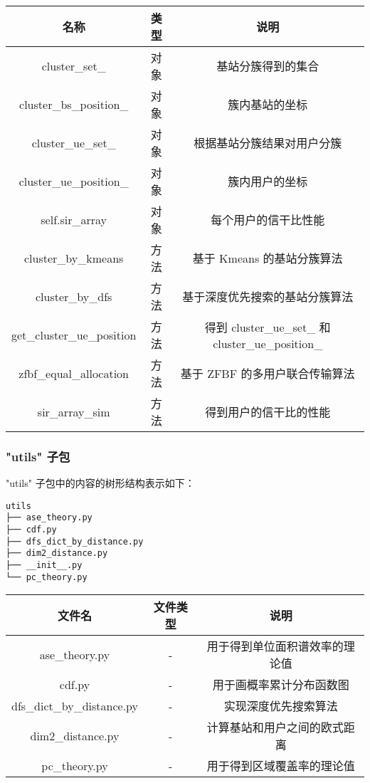 \documentclass[11pt]{article}
\begin{document}
\begin{longtable}[c]{@{}ccc@{}}
\toprule
名称 & 类型 & 说明\tabularnewline
\midrule
\endhead
cluster\_set\_ & 对象 & 基站分簇得到的集合\tabularnewline
cluster\_bs\_position\_ & 对象 & 簇内基站的坐标\tabularnewline
cluster\_ue\_set\_ & 对象 & 根据基站分簇结果对用户分簇\tabularnewline
cluster\_ue\_position\_ & 对象 & 簇内用户的坐标\tabularnewline
self.sir\_array & 对象 & 每个用户的信干比性能\tabularnewline
cluster\_by\_kmeans & 方法 & 基于 Kmeans 的基站分簇算法\tabularnewline
cluster\_by\_dfs & 方法 & 基于深度优先搜索的基站分簇算法\tabularnewline
get\_cluster\_ue\_position & 方法 & 得到 cluster\_ue\_set\_ 和
cluster\_ue\_position\_\tabularnewline
zfbf\_equal\_allocation & 方法 & 基于 ZFBF
的多用户联合传输算法\tabularnewline
sir\_array\_sim & 方法 & 得到用户的信干比的性能\tabularnewline
\bottomrule
\end{longtable}

    \subsubsection{"utils" 子包}\label{utils-ux5b50ux5305}

"utils" 子包中的内容的树形结构表示如下：

\begin{verbatim}
utils
├── ase_theory.py
├── cdf.py
├── dfs_dict_by_distance.py
├── dim2_distance.py
├── __init__.py
└── pc_theory.py
\end{verbatim}

\begin{longtable}[c]{@{}ccc@{}}
\toprule
文件名 & 文件类型 & 说明\tabularnewline
\midrule
\endhead
ase\_theory.py & - & 用于得到单位面积谱效率的理论值\tabularnewline
cdf.py & - & 用于画概率累计分布函数图\tabularnewline
dfs\_dict\_by\_distance.py & - & 实现深度优先搜索算法\tabularnewline
dim2\_distance.py & - & 计算基站和用户之间的欧式距离\tabularnewline
pc\_theory.py & - & 用于得到区域覆盖率的理论值\tabularnewline
\bottomrule
\end{longtable}





    
\end{document}
